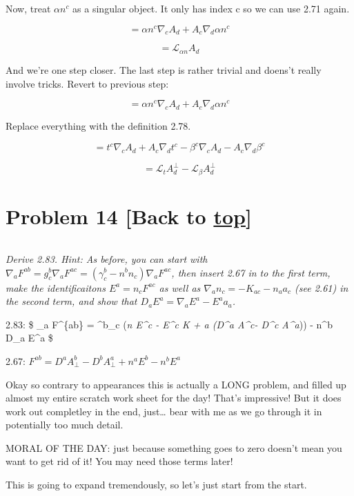 \documentclass[landscape,letterpaper,10pt,english]{article}
\begin{document}
Now, treat \(\alpha n^c\) as a singular object. It only has index c so
we can use 2.71 again.

\[ =  \alpha n^c \nabla_c A_d + A_c \nabla_d \alpha n^c \]

\[ = \mathcal{L}_{\alpha n} A_d \]

And we're one step closer. The last step is rather trivial and doens't
really involve tricks. Revert to previous step:

\[ =  \alpha n^c \nabla_c A_d + A_c \nabla_d \alpha n^c \]

Replace everything with the definition 2.78.

\[ =  t^c \nabla_c A_d + A_c \nabla_d t^c - \beta^c \nabla_c A_d - A_c \nabla_d \beta^c \]

\[ = \mathcal{L}_t A^\perp_d - \mathcal{L}_\beta A^\perp_d \]

    \hypertarget{problem-14-back-to-top}{%
\section{\texorpdfstring{Problem 14 {[}Back to
\hyperref[toc]{top}{]}}{Problem 14 {[}Back to {]}}}\label{problem-14-back-to-top}}

\[\label{P14}\]

\emph{Derive 2.83. Hint: As before, you can start with
\(\nabla_a F^{ab} = g^b_c \nabla_a F^{ac} = (\gamma^b_c - n^bn_c)\nabla_a F^{ac}\),
then insert 2.67 in to the first term, make the identificaitons
\(E^a = n_c F^{ac}\) as well as \(\nabla_a n_c = -K_{ac} -n_aa_c\) (see
2.61) in the second term, and show that
\(D_aE^a = \nabla_a E^a - E^aa_a\).}

2.83: \$ \nabla\_a F\^{}\{ab\} = \gamma\^{}b\_c (\emph{n
E\^{}c - E\^{}c K + \nabla\emph{a (D\^{}a A\^{}c}\perp - D\^{}c
A\^{}a}\perp)) - n\^{}b D\_a E\^{}a \$

    2.67: \(F^{ab} = D^a A^b_\perp - D^b A^a_\perp + n^aE^b - n^bE^a\)

    Okay so contrary to appearances this is actually a LONG problem, and
filled up almost my entire scratch work sheet for the day! That's
impressive! But it does work out completley in the end, just\ldots{}
bear with me as we go through it in potentially too much detail.

MORAL OF THE DAY: just because something goes to zero doesn't mean you
want to get rid of it! You may need those terms later!

This is going to expand tremendously, so let's just start from the
start.
\end{document}
